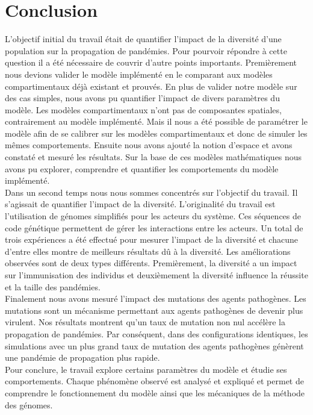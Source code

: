 \chapter{Conclusion} \label{ch:conclusion}

L'objectif initial du travail était de quantifier l'impact de la diversité d'une population sur la propagation de pandémies. Pour pourvoir répondre à cette question il a été nécessaire de couvrir d'autre points importants. Premièrement nous devions valider le modèle implémenté en le comparant aux modèles compartimentaux déjà existant et prouvés. En plus de valider notre modèle sur des cas simples, nous avons pu quantifier l'impact de divers paramètres du modèle. Les modèles compartimentaux n'ont pas de composantes spatiales, contrairement au modèle implémenté. Mais il nous a été possible de paramétrer le modèle afin de se calibrer sur les modèles compartimentaux et donc de simuler les mêmes comportements. Ensuite nous avons ajouté la notion d'espace et avons constaté et mesuré les résultats. Sur la base de ces modèles mathématiques nous avons pu explorer, comprendre et quantifier les comportements du modèle implémenté.\\

Dans un second temps nous nous sommes concentrés sur l'objectif du travail. Il s'agissait de quantifier l'impact de la diversité. L'originalité du travail est l'utilisation de génomes simplifiés pour les acteurs du système. Ces séquences de code génétique permettent de gérer les interactions entre les acteurs. Un total de trois expériences a été effectué pour mesurer l'impact de la diversité et chacune d'entre elles montre de meilleurs résultats dû à la diversité. Les améliorations observées sont de deux types différents. Premièrement, la diversité a un impact sur l'immunisation des individus et deuxièmement la diversité influence la réussite et la taille des pandémies.\\

Finalement nous avons mesuré l'impact des mutations des agents pathogènes. Les mutations sont un mécanisme permettant aux agents pathogènes de devenir plus virulent. Nos résultats montrent qu'un taux de mutation non nul accélère la propagation de pandémies. Par conséquent, dans des configurations identiques, les simulations avec un plus grand taux de mutation des agents pathogènes génèrent une pandémie de propagation plus rapide.\\

Pour conclure, le travail explore certains paramètres du modèle et étudie ses comportements. Chaque phénomène observé est analysé et expliqué et permet de comprendre le fonctionnement du modèle ainsi que les mécaniques de la méthode des génomes. 